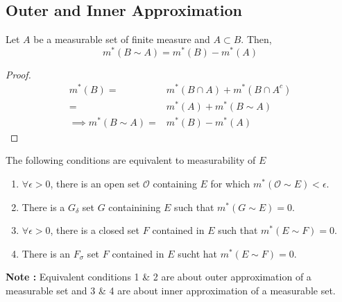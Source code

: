 \subsection{Outer and Inner Approximation}
\begin{definition}
Let $A$ be a measurable set of finite measure and $A \subset B$.
	Then,
\begin{equation}
	m^\ast(B \sim A) = m^\ast(B) - m^\ast(A)
\end{equation}
\begin{proof}
\begin{align*}
	m^\ast(B) = & m^\ast(B \cap A) + m^\ast(B \cap A^c) \\
	= & m^\ast(A) + m^\ast(B \sim A) \\
	\implies m^\ast(B \sim A) = & m^\ast(B) - m^\ast(A)
\end{align*}
\end{proof}
\end{definition}

\begin{theorem}[approximation]
	The following conditions are equivalent to measurability of $E$
\begin{enumerate}
	\item $\forall \epsilon > 0$, there is an open set $\mathcal{O}$ containing $E$ for which $m^\ast(\mathcal{O}\sim E) < \epsilon$.
	\item There is a $G_\delta$ set $G$ containining $E$ such that $m^\ast(G \sim E) = 0$.
	\item $\forall \epsilon > 0$, there is a closed set $F$ contained in $E$ such that $m^\ast(E\sim F) = 0$.
	\item There is an $F_\sigma$ set $F$ contained in $E$ sucht hat $m^\ast(E \sim F) = 0$.
\end{enumerate}
\end{theorem}

\textbf{Note :} Equivalent conditions 1 \& 2 are about outer approximation of a measurable set and 3 \& 4 are about inner approximation of a measurable set.\\


